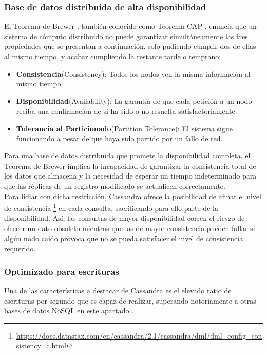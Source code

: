 \subsubsection{Base de datos distribuida de alta disponibilidad}

El Teorema de Brewer \cite{gilbert2002brewer}, también conocido como Teorema CAP , enuncia que un sistema de cómputo distribuido no puede  garantizar simultáneamente las tres propiedades que se presentan a continuación, solo pudiendo cumplir dos de ellas al mismo tiempo, y acabar cumpliendo la restante tarde o temprano:

\begin{itemize}
	\item \textbf{Consistencia}(Consistency): Todos los nodos ven la misma información al mismo tiempo.
	\item \textbf{Disponibilidad}(Availability): La garantía de que cada petición a un nodo reciba una confirmación de si ha sido o no resuelta satisfactoriamente.
	\item \textbf{Tolerancia al Particionado}(Partition Tolerance): El sistema sigue funcionando a pesar de que haya sido partido por un fallo de red.
\end{itemize}

Para una base de datos distribuida que promete la disponibilidad completa, el Teorema de Brewer implica la incapacidad de garantizar la consistencia total de los datos que almacena y la necesidad de esperar un tiempo indeterminado para que las réplicas de un registro modificado se actualicen correctamente.\\

Para lidiar con dicha restricción, Cassandra ofrece la posibilidad de afinar el nivel de consistencia \footnote{\url{https://docs.datastax.com/en/cassandra/2.1/cassandra/dml/dml_config_consistency_c.html}} en cada consulta, sacrificando para ello parte de la disponibilidad. Así, las consultas de mayor disponibilidad corren el riesgo de ofrecer un dato obsoleto mientras que las de mayor consistencia pueden fallar si algún nodo caído provoca que no se pueda satisfacer el nivel de consistencia requerido.\\

\subsubsection{Optimizado para escrituras}

Una de las características a destacar de Cassandra es el elevado ratio de escrituras por segundo que es capaz de realizar, superando notoriamente a otras bases de datos NoSQL en este apartado \cite{rabl2012solving}.

